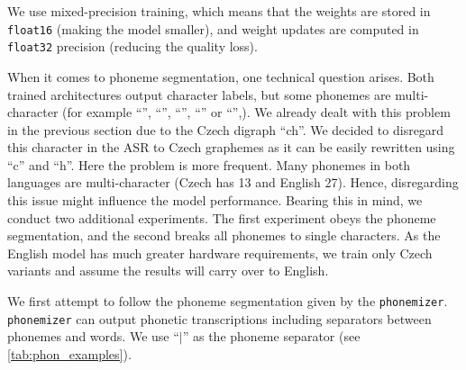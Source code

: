 We use mixed-precision training, which means that the weights are stored in \texttt{float16} (making the model smaller), and weight updates are computed in \texttt{float32} precision (reducing the quality loss).

When it comes to phoneme segmentation, one technical question arises. Both trained architectures output character labels, but some phonemes are multi-character (for example ``'', ``'', ``'', ``'' or ``'',). We already dealt with this problem in the previous section due to the Czech digraph ``ch''. We decided to disregard this character in the ASR to Czech graphemes as it can be easily rewritten using ``c'' and ``h''. Here the problem is more frequent. Many phonemes in both languages are multi-character (Czech has 13 and English 27).  Hence, disregarding this issue might influence the model performance. Bearing this in mind, we conduct two additional experiments. The first experiment obeys the phoneme segmentation, and the second breaks all phonemes to single characters. As the English model has much greater hardware requirements, we train only Czech variants and assume the results will carry over to English.

We first attempt to follow the phoneme segmentation given by the \texttt{phonemizer}. \texttt{phonemizer} can output phonetic transcriptions including separators between pho\-ne\-mes and words. We use ``$\mid$'' as the phoneme separator (see \cref{tab:phon_examples}). 


